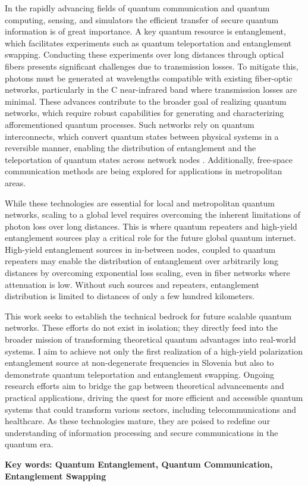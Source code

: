 \documentclass{article}
\theoremstyle{mytheoremstyle}
\theoremstyle{mytheoremstyle}
\theoremstyle{myproblemstyle}
\begin{document}
In the rapidly advancing fields of quantum communication and quantum computing, sensing, and simulators
the efficient transfer of secure quantum information is of great importance.
A key quantum resource is entanglement, which facilitates experiments such as quantum teleportation and entanglement swapping.
Conducting these experiments over long distances through optical fibers presents significant challenges due to transmission losses.
To mitigate this, photons must be generated at wavelengths compatible with existing fiber-optic networks,
particularly in the C near-infrared band where transmission losses are minimal.
These advances contribute to the broader goal of realizing quantum networks,
which require robust capabilities for generating and characterizing afforementioned quantum processes. %
Such networks rely on quantum interconnects, which convert quantum states between physical systems in a reversible manner,
enabling the distribution of entanglement and the teleportation of quantum states across network nodes \cite{Kimble_2008}.
Additionally, free-space communication methods \cite{Kržić_et_al_2023} are being explored for applications in metropolitan areas.
\par While these technologies are essential for local and metropolitan quantum networks, scaling to a global level requires overcoming
the inherent limitations of photon loss over long distances. This is where quantum repeaters and high-yield entanglement sources
play a critical role for the future global quantum internet. High-yield entanglement sources in in-between nodes, coupled to
quantum repeaters may enable the distribution of entanglement over arbitrarily long distances by overcoming exponential loss scaling,
even in fiber networks where attenuation is low. Without such sources and repeaters, entanglement distribution is limited to distances
of only a few hundred kilometers.
\par This work seeks to establish the technical bedrock for future scalable quantum networks. These efforts do not exist in isolation;
they directly feed into the broader mission of transforming theoretical quantum advantages into real-world systems.
I aim to achieve not only the first realization of a high-yield polarization entanglement source at non-degenerate
frequencies in Slovenia but also to demonstrate quantum teleportation and entanglement swapping.
Ongoing research efforts aim to bridge the gap between theoretical advancements and practical applications,
driving the quest for more efficient and accessible quantum systems that could transform various sectors,
including telecommunications and healthcare. As these technologies mature, they are poised to redefine our
understanding of information processing and secure communications in the quantum era.
\par\textbf{Key words: Quantum Entanglement, Quantum Communication, Entanglement Swapping}
\end{document}
